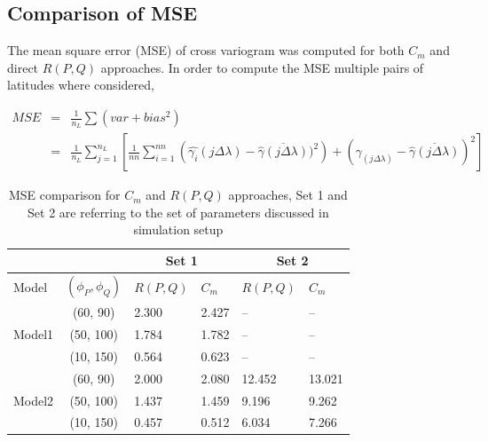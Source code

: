 \vskip 24pt

\subsection{\bf Comparison of MSE}

The mean square error (MSE) of cross variogram was computed for both $C_m$ and direct $R(P,Q)$ approaches. In order to compute the MSE multiple pairs of latitudes where considered,

\begin{eqnarray*}
MSE &=& \frac{1}{n_L} \sum (var + bias^2) \\
    &= & \frac{1}{n_L} \sum_{j=1}^{n_L} \left[ \frac{1}{nn}\sum_{i=1}^{nn}\left(\hat{\gamma_{i}}(j\Delta\lambda)-\overline{\hat{\gamma}(j\Delta\lambda)})^2\right) +  (\gamma_(j\Delta\lambda) - \overline{\hat{\gamma}(j\Delta\lambda)})^2 \right]
\end{eqnarray*}

\begin{table}[H]
\label{parameters}
\centering
\begin{tabular}{|l|c|l|l|l|l|}
\hline 
\multicolumn{2}{|c|}{}  & \multicolumn{2}{|c|}{Set 1} & \multicolumn{2}{|c|}{Set 2}  \\ \hline
  Model                 & $(\phi_P, \phi_Q)$    & $R(P,Q)$  & $C_m$  & $R(P,Q)$  & $C_m$  \\ \hline
\multirow{3}{*}{Model1} & (60, 90)  & 2.300     & 2.427	& --	& --	 \\
                        & (50, 100) & 1.784     & 1.782	& --	& --	 \\ 
                        & (10, 150) & 0.564     & 0.623	& --	& --	 \\ \hline
\multirow{3}{*}{Model2} & (60, 90)  & 2.000     & 2.080	& 12.452	& 13.021 \\  
                        & (50, 100) & 1.437     & 1.459	& 9.196	  & 9.262 \\  
                        & (10, 150) & 0.457     & 0.512	& 6.034	  & 7.266 \\ \hline 
\end{tabular}
\caption{MSE comparison for $C_m$ and $R(P,Q)$ approaches, Set 1 and Set 2 are referring to the set of parameters discussed in simulation setup}
\end{table}


